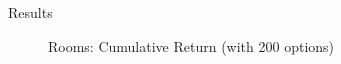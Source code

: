
\begin{block}{Results}
    \begin{figure}[h]
        \centering
        \label{fig:rooms-performance}
        \caption{Rooms: Cumulative Return (with 200 options)}
    \end{figure}


\end{block}
